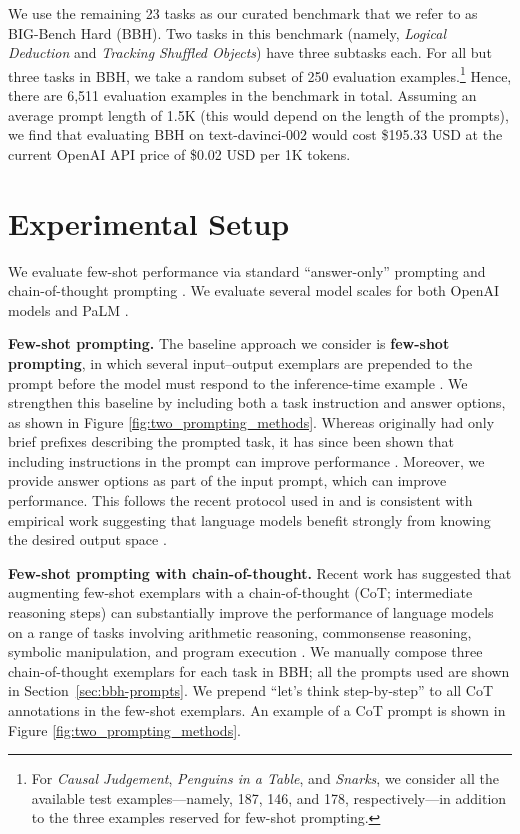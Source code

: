 We use the remaining 23 tasks as our curated benchmark that we refer to as BIG-Bench Hard (BBH). Two tasks in this benchmark (namely, \emph{Logical Deduction} and \emph{Tracking Shuffled Objects}) have three subtasks each. For all but three tasks in BBH, we take a random subset of 250 evaluation examples.\footnote{For \emph{Causal Judgement}, \emph{Penguins in a Table}, and \emph{Snarks}, we consider all the available test examples---namely, 187, 146, and 178, respectively---in addition to the three examples reserved for few-shot prompting.} Hence, there are 6,511 evaluation examples in the benchmark in total. Assuming an average prompt length of 1.5K (this would depend on the length of the prompts), we find that evaluating BBH on text-davinci-002 would cost \$195.33 USD at the current OpenAI API price of \$0.02 USD per 1K tokens.

\section{Experimental Setup}
\label{sec:methodology}

We evaluate few-shot performance via standard ``answer-only'' prompting \citep{brown2020language,srivastava2022beyond} and chain-of-thought prompting \citep{wei2022chain}. We evaluate several model scales for both OpenAI models \citep{brown2020language,ouyang2022training,chen2021codex} and PaLM \citep{chowdhery2022palm}.

\textbf{Few-shot prompting.} The baseline approach we consider is \textbf{few-shot prompting}, in which several input--output exemplars are prepended to the prompt before the model must respond to the inference-time example \citep{brown2020language}. We strengthen this baseline by including both a task instruction and answer options, as shown in Figure \ref{fig:two_prompting_methods}.
Whereas \citet{brown2020language} originally had only brief prefixes describing the prompted task, it has since been shown that including instructions in the prompt can improve performance \citep[][\textit{inter alia}]{sanh2022multitask,min2022metaicl}. Moreover, we provide answer options as part of the input prompt, which can improve performance. This follows the recent protocol used in \citep[][\textit{inter alia}]{rae2021scaling,wei2021finetuned,kadavath2022language} and is consistent with empirical work suggesting that language models benefit strongly from knowing the desired output space \citep{min2022rethinking}.

\textbf{Few-shot prompting with chain-of-thought.} Recent work has suggested that augmenting few-shot exemplars with a chain-of-thought (CoT; intermediate reasoning steps) can substantially improve the performance of language models on a range of tasks involving arithmetic reasoning, commonsense reasoning, symbolic manipulation, and program execution \citep[][\textit{inter alia}]{wei2022chain,zhou2022least,drozdov2022compositional,nye2021show}. We manually compose three chain-of-thought exemplars for each task in BBH; all the prompts used are shown in Section~\ref{sec:bbh-prompts}.
We prepend ``let's think step-by-step'' \citep{kojima2022large} to all CoT annotations in the few-shot exemplars. An example of a CoT prompt is shown in Figure \ref{fig:two_prompting_methods}.


